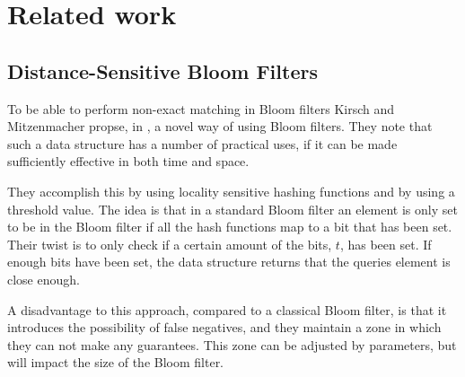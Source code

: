 \documentclass[a4paper,11pt]{article}
\begin{document}



\section{Related work} %

\subsection{Distance-Sensitive Bloom Filters}
To be able to perform non-exact matching in Bloom filters Kirsch and Mitzenmacher propse, in \cite{paper:harvard}, a novel way of using Bloom filters. They note that such a data structure has a number of practical uses, if it can be made sufficiently effective in both time and space.

They accomplish this by using locality sensitive hashing functions and by using a threshold value. The idea is that in a standard Bloom filter an element is only set to be in the Bloom filter if all the hash functions map to a bit that has been set. Their twist is to only check if a certain amount of the bits, $t$, has been set. If enough bits have been set, the data structure returns that the queries element is close enough.



A disadvantage to this approach, compared to a classical Bloom filter, is that it introduces the possibility of false negatives, and they maintain a zone in which they can not make any guarantees. This zone can be adjusted by parameters, but will impact the size of the Bloom filter.
\end{document}
